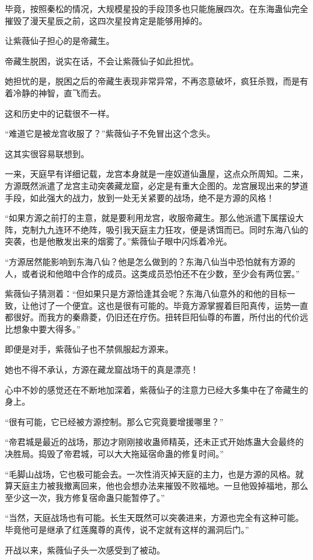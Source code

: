 \begin{this_body}
毕竟，按照秦松的情况，大规模星投的手段顶多也只能施展四次。在东海蛊仙完全摧毁了漫天星辰之前，这四次星投肯定是能够用掉的。

让紫薇仙子担心的是帝藏生。

帝藏生脱困，说实在话，不会让紫薇仙子如此担忧。

她担忧的是，脱困之后的帝藏生表现非常异常，不再恣意破坏，疯狂杀戮，而是有着冷静的神智，直飞而去。

这和历史中的记载很不一样。

“难道它是被龙宫收服了？”紫薇仙子不免冒出这个念头。

这其实很容易联想到。

一来，天庭早有详细记载，龙宫本身就是一座奴道仙蛊屋，这点众所周知。二来，方源既然派遣了龙宫主动突袭藏龙窟，必定是有重大企图的。龙宫展现出来的梦道手段，如此强大的战力，放到一处无关紧要的战场，绝不是方源的风格！

“如果方源之前打的主意，就是要利用龙宫，收服帝藏生。那么他派遣下属摆设大阵，克制九九连环不绝阵，吸引我天庭主力狂攻，便是诱饵而已。同时东海八仙的突袭，也是他散发出来的烟雾了。”紫薇仙子眼中闪烁着冷光。

“方源居然能影响到东海八仙？他是怎么做到的？东海八仙当中恐怕就有方源的人，或者说和他暗中合作的成员。这类成员恐怕还不在少数，至少会有两位罢。”

紫薇仙子猜测着：“但如果只是方源恰逢其会呢？东海八仙意外的和他的目标一致，让他讨了一个便宜。这也是很有可能的。毕竟方源掌握着巨阳真传，运势一直都很好。而我方的秦鼎菱，仍旧还在疗伤。扭转巨阳仙尊的布置，所付出的代价远比想象中要大得多。”

即便是对手，紫薇仙子也不禁佩服起方源来。

她也不得不承认，方源在藏龙窟战场干的真是漂亮！

心中不妙的感觉还在不断地加深着，紫薇仙子的注意力已经大多集中在了帝藏生的身上。

“很有可能，它已经被方源控制。那么它究竟要增援哪里？”

“帝君城是最近的战场，那边才刚刚接收蛊师精英，还未正式开始炼蛊大会最终的决胜局。捣毁了帝君城，可以大大拖延宿命蛊的修复时间。”

“毛脚山战场，它也极可能会去。一次性消灭掉天庭的主力，也是方源的风格。就算天庭主力被我撤离回来，他也会想办法来摧毁不败福地。一旦他毁掉福地，那么至少这一次，我方修复宿命蛊只能暂停了。”

“当然，天庭战场也有可能。长生天既然可以突袭进来，方源也完全有这种可能。毕竟他可是继承了红莲魔尊的真传，说不定就有这样的漏洞后门。”

开战以来，紫薇仙子头一次感受到了被动。


\end{this_body}
